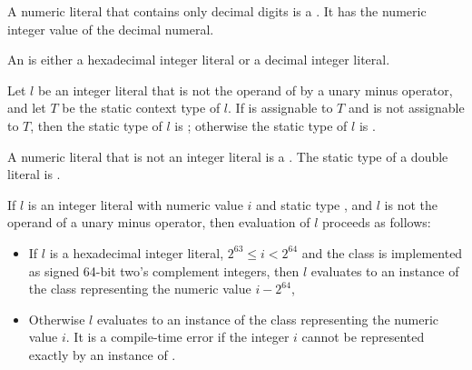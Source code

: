 \documentclass[makeidx]{article}
\begin{document}
\LMHash{}%
A numeric literal that contains only decimal digits is a
.
It has the numeric integer value of the decimal numeral.

\LMHash{}%
An 
is either a hexadecimal integer literal or a decimal integer literal.

\LMHash{}%
Let $l$ be an integer literal that is not the operand
of by a unary minus operator,
and let $T$ be the static context type of $l$.
If  is assignable to $T$ and  is not assignable to $T$,
then the static type of $l$ is ;
otherwise the static type of $l$ is .

\LMHash{}%
A numeric literal that is not an integer literal is a
.
The static type of a double literal is .

\LMHash{}%
If $l$ is an integer literal with numeric value $i$ and static type ,
and $l$ is not the operand of a unary minus operator,
then evaluation of $l$ proceeds as follows:
\begin{itemize}
  \item{} If $l$ is a hexadecimal integer literal,
  $2^{63} \le i < 2^{64}$ and the  class is implemented as
  signed 64-bit two's complement integers,
  then $l$ evaluates to an instance of the  class
  representing the numeric value $i - 2^{64}$,
  \item{} Otherwise $l$ evaluates to an instance of the  class
  representing the numeric value $i$.
  It is a compile-time error if the integer $i$ cannot be represented
  exactly by an instance of .
\end{itemize}

\end{document}
